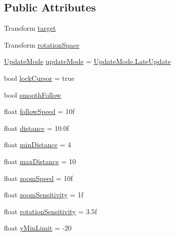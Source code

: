 \subsection*{Public Attributes}
\begin{DoxyCompactItemize}
\item 
Transform \mbox{\hyperlink{class_root_motion_1_1_camera_controller_a0589d3fa45a82b6a79522a16dfba11f4}{target}}
\item 
Transform \mbox{\hyperlink{class_root_motion_1_1_camera_controller_a051b2d5c33f5ac547f54ffe647b1397a}{rotation\+Space}}
\item 
\mbox{\hyperlink{class_root_motion_1_1_camera_controller_ae662cdbe3ccf669cdb38fad428386edb}{Update\+Mode}} \mbox{\hyperlink{class_root_motion_1_1_camera_controller_abd10bb8a6fd472893836243533966417}{update\+Mode}} = \mbox{\hyperlink{class_root_motion_1_1_camera_controller_ae662cdbe3ccf669cdb38fad428386edba2609005edfde618c70f2140bb3e9b7c2}{Update\+Mode.\+Late\+Update}}
\item 
bool \mbox{\hyperlink{class_root_motion_1_1_camera_controller_acfc0b4d6171e20f5e45cd7e5925c8496}{lock\+Cursor}} = true
\item 
bool \mbox{\hyperlink{class_root_motion_1_1_camera_controller_af35c150687f192958e6fd17032ede6b7}{smooth\+Follow}}
\item 
float \mbox{\hyperlink{class_root_motion_1_1_camera_controller_a816eb98a1e6dd2f65206c508f8ff286f}{follow\+Speed}} = 10f
\item 
float \mbox{\hyperlink{class_root_motion_1_1_camera_controller_a385f66995014ea5fd9b5d8e038346798}{distance}} = 10.\+0f
\item 
float \mbox{\hyperlink{class_root_motion_1_1_camera_controller_ad619b1f97da4f28db4f1c982991a2aea}{min\+Distance}} = 4
\item 
float \mbox{\hyperlink{class_root_motion_1_1_camera_controller_abbf2547b284492db30a46476b50cb75d}{max\+Distance}} = 10
\item 
float \mbox{\hyperlink{class_root_motion_1_1_camera_controller_a9c90323ef8f857942e5a447ed4785587}{zoom\+Speed}} = 10f
\item 
float \mbox{\hyperlink{class_root_motion_1_1_camera_controller_ae802c794ea855ffc7c3b8bb6881aa33a}{zoom\+Sensitivity}} = 1f
\item 
float \mbox{\hyperlink{class_root_motion_1_1_camera_controller_adc76e1944cedb49ed09a94dbac21a669}{rotation\+Sensitivity}} = 3.\+5f
\item 
float \mbox{\hyperlink{class_root_motion_1_1_camera_controller_ade3c747cafea9be6bf3bb5c2b47159ff}{y\+Min\+Limit}} = -\/20

\end{DoxyCompactItemize}
